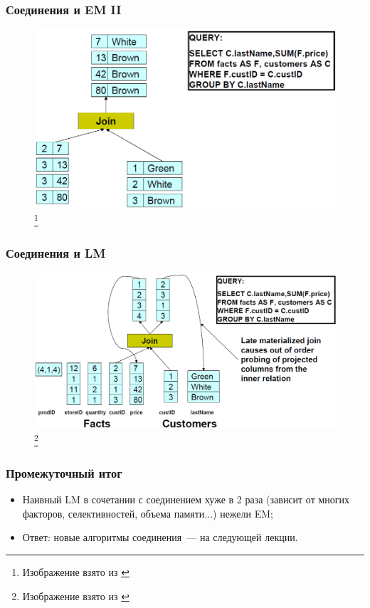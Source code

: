 \documentclass{beamer}
\begin{document}
\begin{frame}
\frametitle{Соединения и EM II}

\begin{figure}[htb]
\includegraphics[width=\textwidth,height=0.75\textheight,keepaspectratio]{em-join2.png} 
\footnote{\tiny{Изображение взято из \cite{Harizopoulos2009}}}
 \end{figure}    

\end{frame}

\begin{frame}
\frametitle{Соединения и LM}

\begin{figure}[htb]
\includegraphics[width=\textwidth,height=0.75\textheight,keepaspectratio]{lm-join1.png} 
\footnote{\tiny{Изображение взято из \cite{Harizopoulos2009}}}
 \end{figure}    

\end{frame}

\begin{frame}
\frametitle{Промежуточный итог}

\begin{itemize}
  \setlength\itemsep{1em}
  \item Наивный LM в сочетании с соединением хуже в 2 раза (зависит от многих факторов, селективностей, объема памяти...) нежели EM;
  \item Ответ: новые алгоритмы соединения~--- на следующей лекции.
\end{itemize}

\end{frame}
\end{document}
